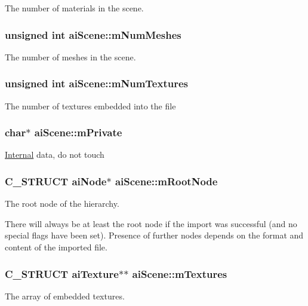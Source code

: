 The number of materials in the scene. \hypertarget{structai_scene_a1a6c1abca994c54381a28cc151e5fa4f}{
\subsubsection[{m\+Num\+Meshes}]{\setlength{\rightskip}{0pt plus 5cm}unsigned int ai\+Scene\+::m\+Num\+Meshes}}\label{structai_scene_a1a6c1abca994c54381a28cc151e5fa4f}
The number of meshes in the scene. \hypertarget{structai_scene_a0d61a5439edd7223097b48aea57c47dd}{
\subsubsection[{m\+Num\+Textures}]{\setlength{\rightskip}{0pt plus 5cm}unsigned int ai\+Scene\+::m\+Num\+Textures}}\label{structai_scene_a0d61a5439edd7223097b48aea57c47dd}
The number of textures embedded into the file \hypertarget{structai_scene_adc5fcf5c4ef86a45f721560d6c1a4923}{
\subsubsection[{m\+Private}]{\setlength{\rightskip}{0pt plus 5cm}char$\ast$ ai\+Scene\+::m\+Private}}\label{structai_scene_adc5fcf5c4ef86a45f721560d6c1a4923}
\hyperlink{struct_internal}{Internal} data, do not touch \hypertarget{structai_scene_ad0e9a7e68f2ed6b3120a7c19ef20307a}{
\subsubsection[{m\+Root\+Node}]{\setlength{\rightskip}{0pt plus 5cm}C\+\_\+\+S\+T\+R\+U\+C\+T {\bf ai\+Node}$\ast$ ai\+Scene\+::m\+Root\+Node}}\label{structai_scene_ad0e9a7e68f2ed6b3120a7c19ef20307a}
The root node of the hierarchy.

There will always be at least the root node if the import was successful (and no special flags have been set). Presence of further nodes depends on the format and content of the imported file. \hypertarget{structai_scene_a0fd0d29fbc439e3715b4975ccb68d2d3}{
\subsubsection[{m\+Textures}]{\setlength{\rightskip}{0pt plus 5cm}C\+\_\+\+S\+T\+R\+U\+C\+T {\bf ai\+Texture}$\ast$$\ast$ ai\+Scene\+::m\+Textures}}\label{structai_scene_a0fd0d29fbc439e3715b4975ccb68d2d3}
The array of embedded textures.

